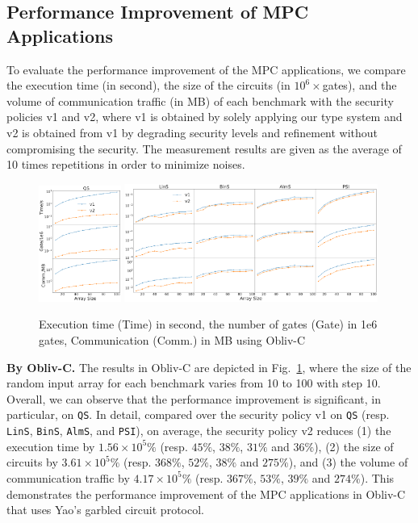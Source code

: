 \subsection{Performance Improvement of MPC Applications}
To evaluate the performance improvement of the MPC applications,
we compare the execution time (in second), the size of the circuits (in $10^6\times$gates), and
the volume of communication traffic (in MB) of each benchmark with the security policies v1 and v2,
where v1 is obtained by solely applying our type system
and v2 is obtained from v1 by degrading security levels and refinement
without compromising the security.
The measurement results are given as the average of 10 times repetitions in order to minimize
noises.

\begin{figure}[t]
    \centering
    \includegraphics[width=0.24\textwidth]{img/gc100Left}
    \includegraphics[width=0.74\textwidth]{img/gc100Right}
    \vspace{-1mm}
    \caption{Execution time (Time) in second, the number of gates (Gate) in 1e6 gates, Communication (Comm.) in MB using Obliv-C}
    \label{fig:gc}  \vspace{-2mm}
\end{figure}

\smallskip
\noindent
{\bf By Obliv-C.} The results in Obliv-C are depicted in Fig.~\ref{fig:gc}, where
the size of the random input array for each benchmark varies from 10 to 100 with step 10.
Overall, we can observe that the performance improvement is significant, in particular,
on {\tt QS}.
%
In detail, compared over the security policy v1 on {\tt QS} (resp. {\tt LinS}, {\tt BinS}, {\tt AlmS}, and {\tt PSI}),
on average, the security policy v2 reduces (1) the execution time by $1.56\times 10^5\%$ (resp. $45\%$, $38\%$, $31\%$ and $36\%$),
(2) the size of circuits by $3.61\times 10^5\%$ (resp. $368\%$, $52\%$, $38\%$ and $275\%$),
and (3) the volume of communication traffic by $4.17\times 10^5\%$ (resp. $367\%$, $53\%$, $39\%$ and $274\%$).
This demonstrates the performance improvement of the MPC applications
in  Obliv-C that uses Yao's garbled circuit protocol.

